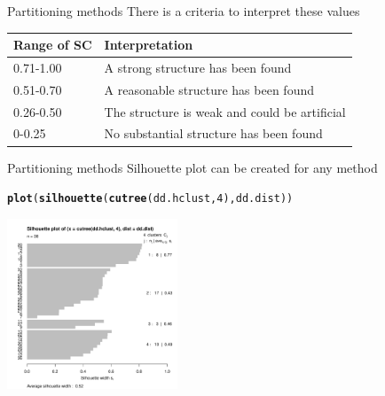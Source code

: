 \documentclass[10pt,xcolor=dvipsnames]{beamer}\usepackage[]{graphicx}\usepackage[]{color}
\makeatletter
\newcommand{\hlnum}[1]{\textcolor[rgb]{0.686,0.059,0.569}{#1}}%
\newcommand{\hlstd}[1]{\textcolor[rgb]{0.345,0.345,0.345}{#1}}%
\newcommand{\hlkwd}[1]{\textcolor[rgb]{0.737,0.353,0.396}{\textbf{#1}}}%
\newenvironment{kframe}{%
 \def\at@end@of@kframe{}%
 \ifinner\ifhmode%
  \def\at@end@of@kframe{\end{minipage}}%
  \begin{minipage}{\columnwidth}%
 \fi\fi%
 \def\FrameCommand##1{\hskip\@totalleftmargin \hskip-\fboxsep
 \colorbox{shadecolor}{##1}\hskip-\fboxsep
     \hskip-\linewidth \hskip-\@totalleftmargin \hskip\columnwidth}%
 \MakeFramed {\advance\hsize-\width
   \@totalleftmargin\z@ \linewidth\hsize
   \@setminipage}}%
 {\par\unskip\endMakeFramed%
 \at@end@of@kframe}
\newenvironment{knitrout}{}{} %
\makeatother
\begin{document}
\begin{frame}{Partitioning methods}
There is a criteria to interpret these values

\begin{table}[h]
\begin{tabular}{ll}
\hline \hline
Range of SC & Interpretation                                \\
\hline
0.71-1.00   & A strong structure has been found             \\
0.51-0.70   & A reasonable structure has been found         \\
0.26-0.50   & The structure is weak and could be artificial \\
0-0.25      & No substantial structure has been found      \\
\hline \hline
\end{tabular}
\end{table}

\end{frame}

\begin{frame}{Partitioning methods}
Silhouette plot can be created for any method
\begin{knitrout}\footnotesize
{}\color{fgcolor}\begin{kframe}
\begin{alltt}
\hlkwd{plot}\hlstd{(}\hlkwd{silhouette}\hlstd{(}\hlkwd{cutree}\hlstd{(dd.hclust,}\hlnum{4}\hlstd{), dd.dist))}
\end{alltt}
\end{kframe}

{\centering \includegraphics[width=2in]{figure/pamPlotAny-1} 

}



\end{knitrout}

\end{frame}
\end{document}

